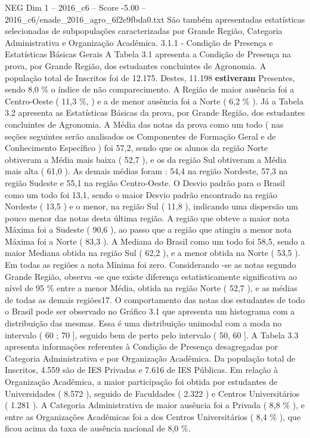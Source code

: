 \begin{textsample}{NEG Dim 1 – 2016\_c6 – Score -5.00 – 2016\_c6/enade\_2016\_agro\_6f2e9fbda0.txt}
São também apresentadas estatísticas selecionadas de subpopulações caracterizadas por Grande Região, Categoria Administrativa e Organização Acadêmica. 3.1.1 - Condição de Presença e Estatísticas Básicas Gerais A Tabela 3.1 apresenta a Condição de Presença na prova, por Grande Região, dos estudantes concluintes de Agronomia.
A população total de Inscritos foi de 12.175.
Destes, 11.198 \textbf{estiveram} Presentes, sendo 8,0 \% o índice de não comparecimento.
A Região de maior ausência foi a Centro-Oeste ( 11,3 \%, ) e a de menor ausência foi a Norte ( 6,2 \% ).
Já a Tabela 3.2 apresenta as Estatísticas Básicas da prova, por Grande Região, dos estudantes concluintes de Agronomia.
A Média das notas da prova como um todo ( nas seções seguintes serão analisados os Componentes de Formação Geral e de Conhecimento Específico ) foi 57,2, sendo que os alunos da região Norte obtiveram a Média mais baixa ( 52,7 ), e os da região Sul obtiveram a Média mais alta ( 61,0 ).
As demais médias foram : 54,4 na região Nordeste, 57,3 na região Sudeste e 55,1 na região Centro-Oeste.
O Desvio padrão para o Brasil como um todo foi 13,1, sendo o maior Desvio padrão encontrado na região Nordeste ( 13,5 ) e o menor, na região Sul ( 11,8 ), indicando uma dispersão um pouco menor das notas desta última região.
A região que obteve a maior nota Máxima foi a Sudeste ( 90,6 ), ao passo que a região que atingiu a menor nota Máxima foi a Norte ( 83,3 ).
A Mediana do Brasil como um todo foi 58,5, sendo a maior Mediana obtida na região Sul ( 62,2 ), e a menor obtida na Norte ( 53,5 ).
Em todas as regiões a nota Mínima foi zero.
Considerando -se as notas segundo Grande Região, observa -se que existe diferença estatisticamente significativa ao nível de 95 \% entre a menor Média, obtida na região Norte ( 52,7 ), e as médias de todas as demais regiões17.
O comportamento das notas dos estudantes de todo o Brasil pode ser observado no Gráfico 3.1 que apresenta um histograma com a distribuição das mesmas.
Essa é uma distribuição unimodal com a moda no intervalo ( 60 ; 70 ], seguido bem de perto pelo intervalo ( 50, 60 ].
A Tabela 3.3 apresenta informações referentes à Condição de Presença desagregadas por Categoria Administrativa e por Organização Acadêmica.
Da população total de Inscritos, 4.559 são de IES Privadas e 7.616 de IES Públicas.
Em relação à Organização Acadêmica, a maior participação foi obtida por estudantes de Universidades ( 8.572 ), seguido de Faculdades ( 2.322 ) e Centros Universitários ( 1.281 ).
A Categoria Administrativa de maior ausência foi a Privada ( 8,8 \% ), e entre as Organizações Acadêmicas foi a dos Centros Universitários ( 8,4 \% ), que ficou acima da taxa de ausência nacional de 8,0 \%.

\end{textsample}
